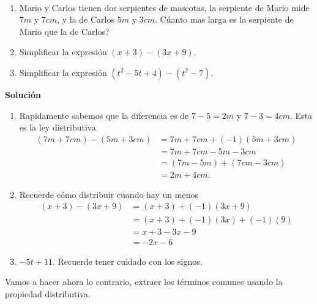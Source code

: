 \begin{ejemplo}{\ \\}
	\begin{enumerate}[label=\Alph*)]
		\item Mario y Carlos tienen dos serpientes de mascotas, la serpiente de Mario mide $7m$ y $7cm$, y la de Carlos $5m$ y $3cm$. Cúanto mas larga es la serpiente de Mario que la de Carlos?
		\item Simplificar la expresión $(x+3) - (3x+9)$.
		\item Simplificar la expresión $(t^2-5t+4)-(t^2-7)$.
	\end{enumerate}
	\textbf{Solución }
	\begin{enumerate}[label=\Alph*)]
		\item Rapidamente sabemos que la diferencia es de $7-5=2m$ y $7-3=4cm$. Esta es la ley distributiva
		\begin{align*}
		(7m+7cm) - (5m+3cm) &= 7m +7cm + (-1)(5m+3cm)\\
		&= 7m +7cm -5m-3cm\\
		&=(7m-5m)+(7cm-3cm)\\
		&=2m+4cm.
		\end{align*}
		\item Recuerde cómo distribuir cuando hay un menos
		\begin{align*}
		(x+3) - (3x+9) &= (x+3) + (-1)(3x+9)\\
		&= (x+3) + (-1)(3x) + (-1)(9)\\
		&= x+3-3x-9\\
		&=-2x-6		
		\end{align*}
		\item $-5t+11$. Recuerde tener cuidado con los signos.
	\end{enumerate}
\end{ejemplo}

Vamos a hacer ahora lo contrario, extraer los términos comunes usando la propiedad distributiva.

